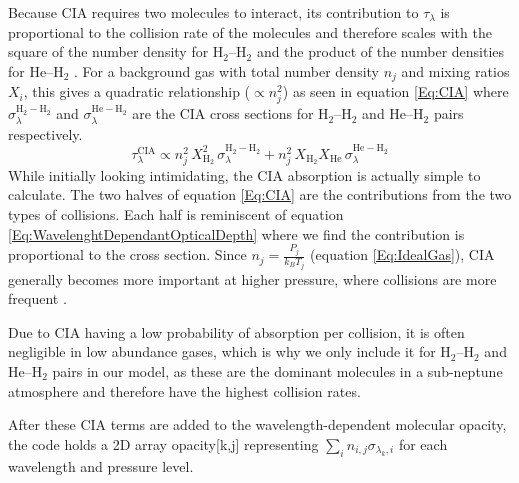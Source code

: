 \documentclass{article}
\begin{document}
Because CIA requires two molecules to interact, its contribution to $\tau_\lambda$ is proportional to the collision rate of the molecules and therefore scales with the square of the number density for H$_2$--H$_2$ and the product of the number densities for He--H$_2$ \cite{Freedman2008}.
For a background gas with total number density $n_j$ and mixing ratios $X_i$, this gives a quadratic relationship ($\propto n_j^2$) as seen in equation \ref{Eq:CIA} where $\sigma_{\lambda}^{\mathrm{H_2-H_2}}$ and $\sigma_{\lambda}^{\mathrm{He-H_2}}$ are the CIA cross sections for H$_2$--H$_2$ and He--H$_2$ pairs respectively.
\begin{equation} 
	\tau_{\lambda}^{\mathrm{CIA}} \propto n_j^2\,X_{\mathrm{H_2}}^2\,\sigma_{\lambda}^{\mathrm{H_2-H_2}} + n_j^2\,X_{\mathrm{H_2}}X_{\mathrm{He}}\,\sigma_{\lambda}^{\mathrm{He-H_2}}
	\label{Eq:CIA}
\end{equation}
While initially looking intimidating, the CIA absorption is actually simple to calculate. 
The two halves of equation \ref{Eq:CIA} are the contributions from the two types of collisions. Each half is reminiscent of equation \ref{Eq:WavelenghtDependantOpticalDepth} where we find the contribution is proportional to the cross section.
Since $n_j = \frac{P_j}{k_B T_j}$ (equation \ref{Eq:IdealGas}), CIA generally becomes more important at higher pressure, where collisions are more frequent \cite{Richard2012}.

Due to CIA having a low probability of absorption per collision, it is often negligible in low abundance gases, which is why we only include it for H$_2$--H$_2$ and He--H$_2$ pairs in our model, as these are the dominant molecules in a sub-neptune atmosphere and therefore have the highest collision rates.

After these CIA terms are added to the wavelength-dependent molecular opacity, the code holds a 2D array opacity[k,j] representing $\sum_i n_{i,j}\sigma_{\lambda_k,i}$ for each wavelength and pressure level.
\end{document}
